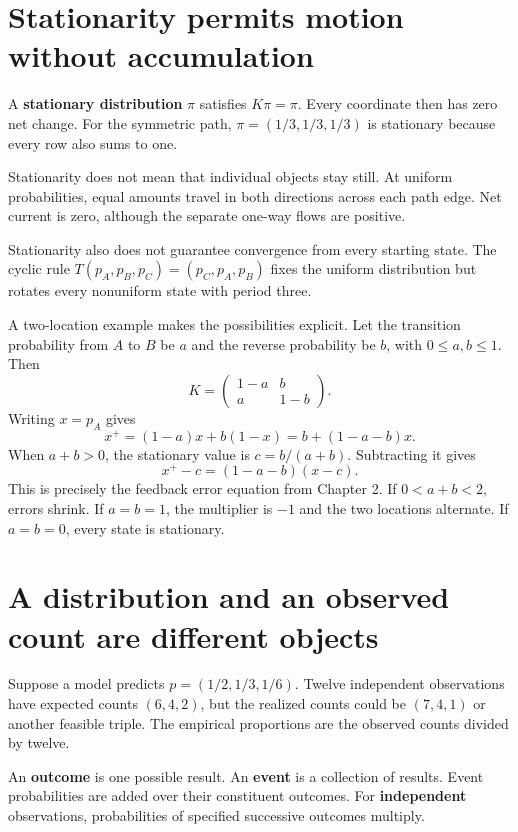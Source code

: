 \documentclass[11pt,oneside,openany]{book}
\theoremstyle{definition}
\theoremstyle{remark}
\numberwithin{equation}{chapter}
\begin{document}
\section{Stationarity permits motion without accumulation}\label{ch04-stationarity-permits-motion-without-accumulation}

A \textbf{stationary distribution} \(\pi\) satisfies \(K\pi=\pi\). Every coordinate then has zero net change. For the symmetric path, \(\pi=(1/3,1/3,1/3)\) is stationary because every row also sums to one.

Stationarity does not mean that individual objects stay still. At uniform probabilities, equal amounts travel in both directions across each path edge. Net current is zero, although the separate one-way flows are positive.

Stationarity also does not guarantee convergence from every starting state. The cyclic rule \(T(p_A,p_B,p_C)=(p_C,p_A,p_B)\) fixes the uniform distribution but rotates every nonuniform state with period three.

A two-location example makes the possibilities explicit. Let the transition probability from \(A\) to \(B\) be \(a\) and the reverse probability be \(b\), with \(0\leq a,b\leq1\). Then \[K=\begin{pmatrix}1-a&b\\a&1-b\end{pmatrix}.\] Writing \(x=p_A\) gives \[x^+=(1-a)x+b(1-x)=b+(1-a-b)x.\] When \(a+b>0\), the stationary value is \(c=b/(a+b)\). Subtracting it gives \[x^+-c=(1-a-b)(x-c).\] This is precisely the feedback error equation from Chapter 2. If \(0<a+b<2\), errors shrink. If \(a=b=1\), the multiplier is \(-1\) and the two locations alternate. If \(a=b=0\), every state is stationary.

\section{A distribution and an observed count are different objects}\label{ch04-a-distribution-and-an-observed-count-are-different-objects}

Suppose a model predicts \(p=(1/2,1/3,1/6)\). Twelve independent observations have expected counts \((6,4,2)\), but the realized counts could be \((7,4,1)\) or another feasible triple. The empirical proportions are the observed counts divided by twelve.

An \textbf{outcome} is one possible result. An \textbf{event} is a collection of results. Event probabilities are added over their constituent outcomes. For \textbf{independent} observations, probabilities of specified successive outcomes multiply.
\end{document}
